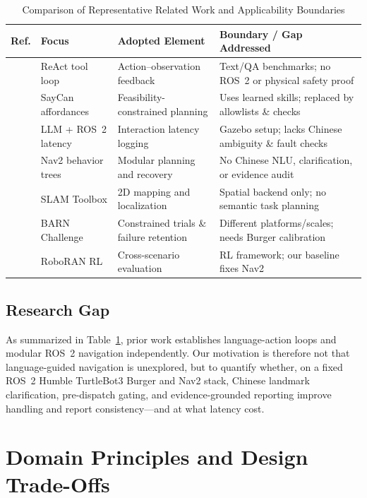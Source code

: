 \documentclass[conference,a4paper]{IEEEtran}
\begin{document}
\begin{table}[!t]
\caption{Comparison of Representative Related Work and Applicability Boundaries}
\label{tab:related_work}
\centering
\scriptsize
\setlength{\tabcolsep}{3pt}
\begin{tabularx}{\columnwidth}{@{} >{\raggedright\arraybackslash}p{0.9cm} >{\raggedright\arraybackslash}p{1.85cm} >{\raggedright\arraybackslash}p{2.25cm} >{\raggedright\arraybackslash}X @{}}
\toprule
\textbf{Ref.} & \textbf{Focus} & \textbf{Adopted Element} & \textbf{Boundary / Gap Addressed} \\
\midrule
\cite{b1} & ReAct tool loop & Action--observation feedback & Text/QA benchmarks; no ROS~2 or physical safety proof \\
\cite{b2} & SayCan affordances & Feasibility-constrained planning & Uses learned skills; replaced by allowlists \& checks \\
\cite{b3} & LLM + ROS~2 latency & Interaction latency logging & Gazebo setup; lacks Chinese ambiguity \& fault checks \\
\cite{b4} & Nav2 behavior trees & Modular planning and recovery & No Chinese NLU, clarification, or evidence audit \\
\cite{b5} & SLAM Toolbox & 2D mapping and localization & Spatial backend only; no semantic task planning \\
\cite{b6, b12} & BARN Challenge & Constrained trials \& failure retention & Different platforms/scales; needs Burger calibration \\
\cite{b7} & RoboRAN RL & Cross-scenario evaluation & RL framework; our baseline fixes Nav2 \\
\bottomrule
\end{tabularx}
\end{table}

\subsection{Research Gap}

As summarized in Table~\ref{tab:related_work}, prior work establishes language-action loops and modular ROS~2 navigation independently. Our motivation is therefore not that language-guided navigation is unexplored, but to quantify whether, on a fixed ROS~2 Humble TurtleBot3 Burger and Nav2 stack, Chinese landmark clarification, pre-dispatch gating, and evidence-grounded reporting improve handling and report consistency---and at what latency cost.

\section{Domain Principles and Design Trade-Offs}
\end{document}
